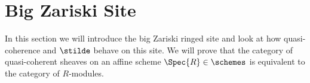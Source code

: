 \section{Big Zariski Site}
In this section we will introduce the big Zariski ringed site
and look at how quasi-coherence and $\stilde$ behave on this site.
We will prove that the category of quasi-coherent sheaves on an affine scheme $\Spec{R} \in \schemes$
is equivalent to the category of $R$-modules.








